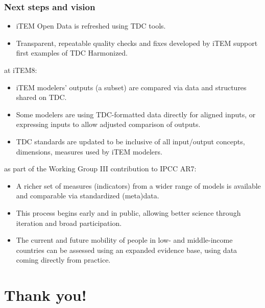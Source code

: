 \documentclass[12pt,aspectratio=169]{beamer}
\begin{document}
\begin{frame}[allowframebreaks]
\frametitle{Next steps and vision}

\begin{itemize}
  \item iTEM Open Data is refreshed using TDC tools.
  \item Transparent, repeatable quality checks and fixes developed by iTEM support first examples of TDC Harmonized.
\end{itemize}

\bigskip
{} at iTEM8:
\begin{itemize}
  \item iTEM modelers' outputs (a subset) are compared via data and structures shared on TDC.
  \item Some modelers are using TDC-formatted data directly for aligned inputs, or expressing inputs to allow adjusted comparison of outputs.
  \item TDC standards are updated to be inclusive of all input/output concepts, dimensions, measures used by iTEM modelers.
\end{itemize}

\framebreak
{} as part of the Working Group III contribution to IPCC AR7:
\begin{itemize}
  \item A richer set of measures (indicators) from a wider range of models is available and comparable via standardized (meta)data.
  \item This process begins early and in public, allowing better science through iteration and broad participation.
  \item The current and future mobility of people in low- and middle-income countries can be assessed using an expanded evidence base, using data coming directly from practice.
\end{itemize}

\end{frame}

\section*{Thank you!}


\end{document}
